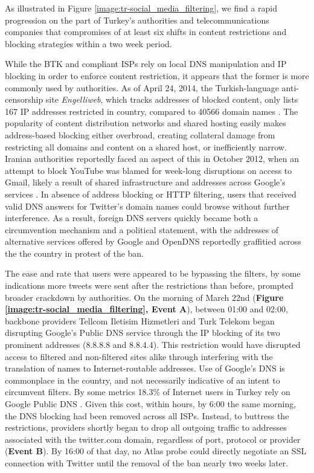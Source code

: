 As illustrated in Figure \ref{image:tr-social_media_filtering}, we find a rapid progression on the part of Turkey's authorities and telecommunications companies that compromises of at least six shifts in content restrictions and blocking strategies within a two week period.

While the BTK and compliant ISPs rely on local DNS manipulation and IP blocking in order to enforce content restriction, it appears that the former is more commonly used by authorities. As of April 24, 2014, the Turkish-language anti-censorship site \textit{Engelliweb}, which tracks addresses of blocked content, only lists 167 IP addresses restricted in country, compared to 40566 domain names \cite{engelliweb}. The popularity of content distribution networks and shared hosting easily makes address-based blocking either overbroad, creating collateral damage from restricting all domains and content on a shared host, or inefficiently narrow. Iranian authorities reportedly faced an aspect of this in October 2012, when an attempt to block  YouTube was blamed for week-long disruptions on access to Gmail, likely a result of shared infrastructure and addresses across Google's services \cite{bbc2012gmail}. In absence of address blocking or HTTP filtering, users that received valid DNS answers for Twitter's domain names could browse without further interference. As a result, foreign DNS servers quickly became both a circumvention mechanism and a political statement, with the addresses of alternative services offered by Google and OpenDNS reportedly graffitied across the the country in protest of the ban.

The ease and rate that users were appeared to be bypassing the filters, by some indications more tweets were sent after the restrictions than before, prompted broader crackdown by authorities. On the morning of March 22nd (\textbf{Figure \ref{image:tr-social_media_filtering}, Event A}), between 01:00 and 02:00, backbone providers Tellcom Iletisim Hizmetleri and Turk Telekom began disrupting Google's Public DNS service through the IP blocking of its two prominent addresses (8.8.8.8 and 8.8.4.4). This restriction would have disrupted access to filtered and non-filtered sites alike through interfering with the translation of names to Internet-routable addresses. Use of Google's DNS is commonplace in the country, and not necessarily indicative of an intent to circumvent filters. By some metrics 18.3\% of Internet users in Turkey rely on Google Public DNS \cite{ispcolumn2013googledns}. Given this cost, within hours, by 6:00 the same morning, the DNS blocking had been removed across all ISPs. Instead, to buttress the restrictions, providers shortly began to drop all outgoing traffic to addresses associated with the twitter.com domain, regardless of port, protocol or provider (\textbf{Event B}). By 16:00 of that day, no Atlas probe could directly negotiate an SSL connection with Twitter until the removal of the ban nearly two weeks later.


